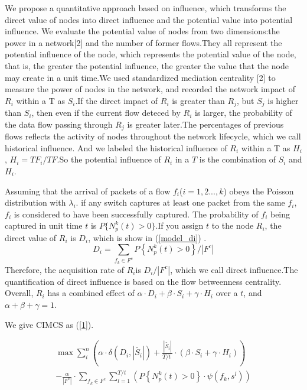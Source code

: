 \documentclass[conference]{IEEEtran}
\begin{document}
We propose a quantitative approach based on influence, which transforms the direct value of nodes into direct influence and the potential value into potential influence. We evaluate the potential value of nodes from two dimensions:the power in a network[2] and the number of former flows.They all represent the potential influence of the node, which represents the potential value of the node, that is, the greater the potential influence, the greater the value that the node may create in a unit time.We used standardized mediation centrality [2] to measure the power of nodes in the network, and recorded the network impact of $R_i$ within a T as $S_i$.If the direct impact of $R_i$ is greater than $R_j$, but $S_j$ is higher than $S_i$, then even if the current flow deteced by $R_i$ is larger, the probability of the data flow passing through $R_j$ is greater later.The percentages of previous flows  reflects the activity of nodes throughout the network lifecycle, which we call historical influence. And we labeled the historical influence of $R_i$ within a T as $H_i $, $H_i = TF_i/TF$.So the potential influence of $R_i$ in a $T$ is the combination of $S_i$ and $H_i$.

Assuming that the arrival of packets of a flow $f_i$($i=1,2...,k$) obeys the Poisson distribution with ${\lambda_{i}}$. if any switch captures at least one packet from the same $f_i$, $f_i$ is considered to have been successfully captured. The probability of $f_i$ being captured in unit time $t$ is $P\{N_p^k (t) >0\}$.If you assign $t$ to the node $R_i$, the direct value of $R_i$ is $D_i$, which is show in (\ref{model_di}) .
\begin{equation}
D_i= \sum\limits_{{{f}_{k}}\in {{F}^{c}}}{P\left\{ N_{p}^{k}\left( t \right)>0 \right\}} /|F^c|
\label{model_di}
\end{equation}
Therefore, the acquisition rate of $R_i$is $D_i/|F^c|$, which we call direct influence.The quantification of direct influence is based on the flow betweenness centrality. Overall, $R_i$ has a combined effect of $\alpha \cdot {{D}_{i}}+\beta \cdot {{S}_{i}}+\gamma \cdot {{H}_{i}}$ over a $t$, and $\alpha +\beta +\gamma  = 1$.

We give CIMCS as (\ref{1}). 

\begin{equation}
\begin{split}
\max \sum\limits_{i}^{n}{(\alpha \cdot {\delta ({{D}_{i}},\left| \widetilde{{{S}_{i}}} \right|)}+\frac{\left| \widetilde{{{S}_{i}}} \right|}{{T}/{t}\;}\cdot (\beta \cdot {{S}_{i}}+\gamma \cdot {{H}_{i}}))}  \\
-\frac{\alpha }{\left| {{F}^{c}} \right|}\cdot \sum\limits_{{{f}_{k}}\in {{F}^{c}}}{\sum\limits_{l=1}^{{T}/{t}\;}{\left( P\left\{ N_{p}^{k}\left( t \right)>0 \right\}\cdot \psi \left( {{f}_{k}},{{s}^{l}} \right) \right)}} \label{1}
\end{split}
\end{equation}
\end{document}
